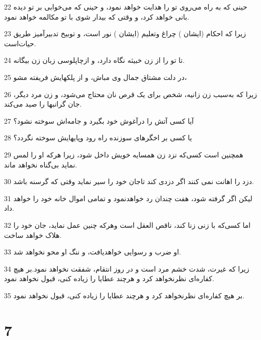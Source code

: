 \par 22 حینی که به راه می‌روی تو را هدایت خواهد نمود، و حینی که می‌خوابی بر تو دیده بانی خواهد کرد، و وقتی که بیدار شوی با تو مکالمه خواهد نمود.
\par 23 زیرا که احکام (ایشان ) چراغ وتعلیم (ایشان ) نور است، و توبیخ تدبیرآمیز طریق حیات‌است.
\par 24 تا تو را از زن خبیثه نگاه دارد، و ازچاپلوسی زبان زن بیگانه.
\par 25 در دلت مشتاق جمال وی مباش، و از پلکهایش فریفته مشو،
\par 26 زیرا که به‌سبب زن زانیه، شخص برای یک قرص نان محتاج می‌شود، و زن مرد دیگر، جان گرانبها را صید می‌کند.
\par 27 آیا کسی آتش را درآغوش خود بگیرد و جامه‌اش سوخته نشود؟
\par 28 یا کسی بر اخگرهای سوزنده راه رود وپایهایش سوخته نگردد؟
\par 29 همچنین است کسی‌که نزد زن همسایه خویش داخل شود، زیرا هر‌که او را لمس نماید بی‌گناه نخواهد ماند.
\par 30 دزد را اهانت نمی کنند اگر دزدی کند تاجان خود را سیر نماید وقتی که گرسنه باشد.
\par 31 لیکن اگر گرفته شود، هفت چندان رد خواهدنمود و تمامی اموال خانه خود را خواهد داد.
\par 32 اما کسی‌که با زنی زنا کند، ناقص العقل است وهر‌که چنین عمل نماید، جان خود را هلاک خواهد ساخت.
\par 33 او ضرب و رسوایی خواهدیافت، و ننگ او محو نخواهد شد.
\par 34 زیرا که غیرت، شدت خشم مرد است و در روز انتقام، شفقت نخواهد نمود.بر هیچ کفاره‌ای نظرنخواهد کرد و هر‌چند عطایا را زیاده کنی، قبول نخواهد نمود.
\par 35 بر هیچ کفاره‌ای نظرنخواهد کرد و هر‌چند عطایا را زیاده کنی، قبول نخواهد نمود.
 
\chapter{7}

